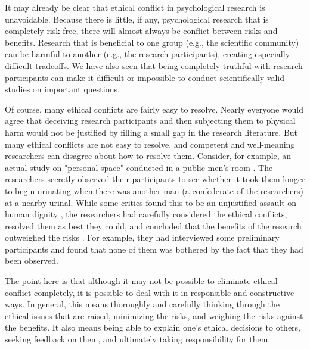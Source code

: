 It may already be clear that ethical conflict in psychological research is unavoidable. Because there is little, if any, psychological research that is completely risk free, there will almost always be conflict between risks and benefits. Research that is beneficial to one group (e.g., the scientific community) can be harmful to another (e.g., the research participants), creating especially difficult tradeoffs. We have also seen that being completely truthful with research participants can make it difficult or impossible to conduct scientifically valid studies on important questions.

Of course, many ethical conflicts are fairly easy to resolve. Nearly everyone would agree that deceiving research participants and then subjecting them to physical harm would not be justified by filling a small gap in the research literature. But many ethical conflicts are not easy to resolve, and competent and well-meaning researchers can disagree about how to resolve them. Consider, for example, an actual study on "personal space" conducted in a public men's room \citep{middlemist_personal_1976}. The researchers secretly observed their participants to see whether it took them longer to begin urinating when there was another man (a confederate of the researchers) at a nearby urinal. While some critics found this to be an unjustified assault on human dignity \citep{koocher_bathroom_1977}, the researchers had carefully considered the ethical conflicts, resolved them as best they could, and concluded that the benefits of the research outweighed the risks \citep{middlemist_what_1977}. For example, they had interviewed some preliminary participants and found that none of them was bothered by the fact that they had been observed.

The point here is that although it may not be possible to eliminate ethical conflict completely, it is possible to deal with it in responsible and constructive ways. In general, this means thoroughly and carefully thinking through the ethical issues that are raised, minimizing the risks, and weighing the risks against the benefits. It also means being able to explain one's ethical decisions to others, seeking feedback on them, and ultimately taking responsibility for them.

